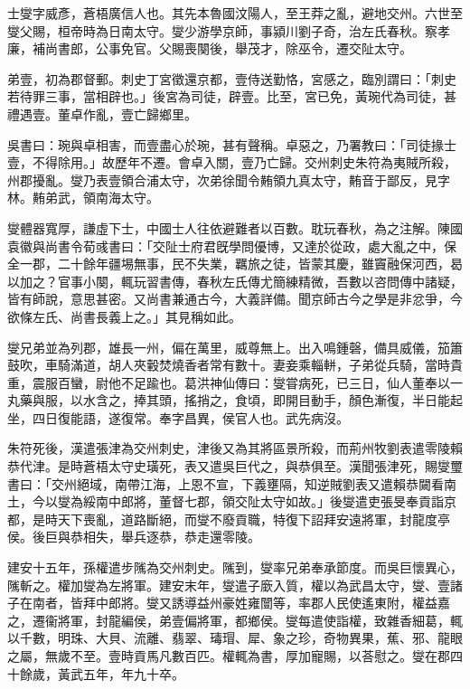 
\begin{pinyinscope}
士燮字威彥，蒼梧廣信人也。其先本魯國汶陽人，至王莽之亂，避地交州。六世至燮父賜，桓帝時為日南太守。燮少游學京師，事潁川劉子奇，治左氏春秋。察孝廉，補尚書郎，公事免官。父賜喪闋後，舉茂才，除巫令，遷交阯太守。

弟壹，初為郡督郵。刺史丁宮徵還京都，壹侍送勤恪，宮感之，臨別謂曰：「刺史若待罪三事，當相辟也。」後宮為司徒，辟壹。比至，宮已免，黃琬代為司徒，甚禮遇壹。董卓作亂，壹亡歸鄉里。

吳書曰：琬與卓相害，而壹盡心於琬，甚有聲稱。卓惡之，乃署教曰：「司徒掾士壹，不得除用。」故歷年不遷。會卓入關，壹乃亡歸。交州刺史朱符為夷賊所殺，州郡擾亂。燮乃表壹領合浦太守，次弟徐聞令䵋領九真太守，䵋音于鄙反，見字林。䵋弟武，領南海太守。

燮體器寬厚，謙虛下士，中國士人往依避難者以百數。耽玩春秋，為之注解。陳國袁徽與尚書令荀彧書曰：「交阯士府君旣學問優博，又達於從政，處大亂之中，保全一郡，二十餘年疆埸無事，民不失業，羈旅之徒，皆蒙其慶，雖竇融保河西，曷以加之？官事小闋，輒玩習書傳，春秋左氏傳尤簡練精微，吾數以咨問傳中諸疑，皆有師說，意思甚密。又尚書兼通古今，大義詳備。聞京師古今之學是非忿爭，今欲條左氏、尚書長義上之。」其見稱如此。

燮兄弟並為列郡，雄長一州，偏在萬里，威尊無上。出入鳴鍾磬，備具威儀，笳簫鼓吹，車騎滿道，胡人夾轂焚燒香者常有數十。妻妾乘輜軿，子弟從兵騎，當時貴重，震服百蠻，尉他不足踰也。葛洪神仙傳曰：燮甞病死，已三日，仙人董奉以一丸藥與服，以水含之，捧其頭，搖捎之，食頃，即開目動手，顏色漸復，半日能起坐，四日復能語，遂復常。奉字昌異，侯官人也。武先病沒。

朱符死後，漢遣張津為交州刺史，津後又為其將區景所殺，而荊州牧劉表遣零陵賴恭代津。是時蒼梧太守史璜死，表又遣吳巨代之，與恭俱至。漢聞張津死，賜燮璽書曰：「交州絕域，南帶江海，上恩不宣，下義壅隔，知逆賊劉表又遣賴恭闚看南土，今以燮為綏南中郎將，董督七郡，領交阯太守如故。」後燮遣吏張旻奉貢詣京都，是時天下喪亂，道路斷絕，而燮不廢貢職，特復下詔拜安遠將軍，封龍度亭侯。後巨與恭相失，舉兵逐恭，恭走還零陵。

建安十五年，孫權遣步隲為交州刺史。隲到，燮率兄弟奉承節度。而吳巨懷異心，隲斬之。權加燮為左將軍。建安末年，燮遣子廞入質，權以為武昌太守，燮、壹諸子在南者，皆拜中郎將。燮又誘導益州豪姓雍闓等，率郡人民使遙東附，權益嘉之，遷衞將軍，封龍編侯，弟壹偏將軍，都鄉侯。燮每遣使詣權，致雜香細葛，輒以千數，明珠、大貝、流離、翡翠、瑇瑁、犀、象之珍，奇物異果，蕉、邪、龍眼之屬，無歲不至。壹時貢馬凡數百匹。權輒為書，厚加寵賜，以荅慰之。燮在郡四十餘歲，黃武五年，年九十卒。


\end{pinyinscope}
